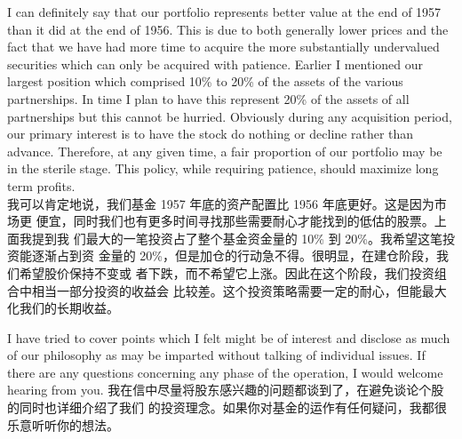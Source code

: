 \begin{verseparallel}
  {
    I can definitely say that our portfolio represents better value at the end
    of 1957 than it did at the end of 1956. This is due to both generally lower
    prices and the fact that we have had more time to acquire the more
    substantially undervalued securities which can only be acquired with
    patience. Earlier I mentioned our largest position which comprised 10\% to
    20\% of the assets of the various partnerships. In time I plan to have this
    represent 20\% of the assets of all partnerships but this cannot be hurried.
    Obviously during any acquisition period, our primary interest is to have the
    stock do nothing or decline rather than advance. Therefore, at any given
    time, a fair proportion of our portfolio may be in the sterile stage. This
    policy, while requiring patience, should maximize long term profits. \\
  }
  {
    我可以肯定地说，我们基金 1957 年底的资产配置比 1956 年底更好。这是因为市场更
    便宜，同时我们也有更多时间寻找那些需要耐心才能找到的低估的股票。上面我提到我
    们最大的一笔投资占了整个基金资金量的 10\% 到 20\%。我希望这笔投资能逐渐占到资
    金量的 20\%，但是加仓的行动急不得。很明显，在建仓阶段，我们希望股价保持不变或
    者下跌，而不希望它上涨。因此在这个阶段，我们投资组合中相当一部分投资的收益会
    比较差。这个投资策略需要一定的耐心，但能最大化我们的长期收益。
  }
\end{verseparallel}

\begin{verseparallel}
  {
    I have tried to cover points which I felt might be of interest and disclose
    as much of our philosophy as may be imparted without talking of individual
    issues. If there are any questions concerning any phase of the operation, I
    would welcome hearing from you.
  }
  {
    我在信中尽量将股东感兴趣的问题都谈到了，在避免谈论个股的同时也详细介绍了我们
    的投资理念。如果你对基金的运作有任何疑问，我都很乐意听听你的想法。
  }
\end{verseparallel}

